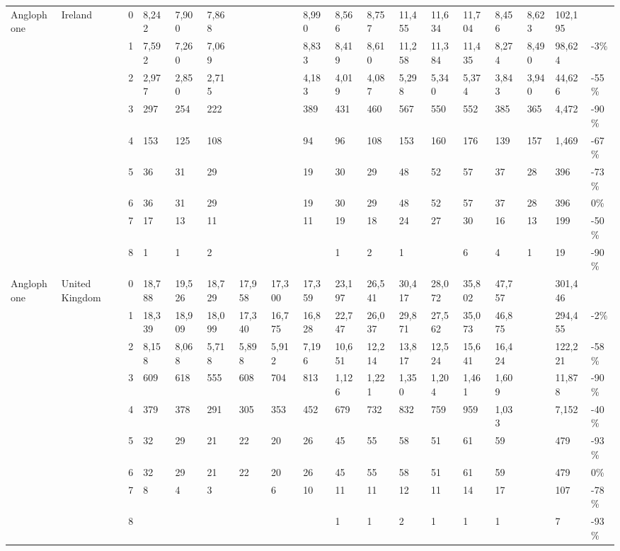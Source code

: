 \begin{longtable}{llllllllllllllllll}
 \hline
Anglophone & Ireland & 0 & 8,242 & 7,900 & 7,868 &  &  & 8,990 & 8,566 & 8,757 & 11,455 & 11,634 & 11,704 & 8,456 & 8,623 & 102,195 &  \\ 
   &  & 1 & 7,592 & 7,260 & 7,069 &  &  & 8,833 & 8,419 & 8,610 & 11,258 & 11,384 & 11,435 & 8,274 & 8,490 & 98,624 & -3\% \\ 
   &  & 2 & 2,977 & 2,850 & 2,715 &  &  & 4,183 & 4,019 & 4,087 & 5,298 & 5,340 & 5,374 & 3,843 & 3,940 & 44,626 & -55\% \\ 
   &  & 3 & 297 & 254 & 222 &  &  & 389 & 431 & 460 & 567 & 550 & 552 & 385 & 365 & 4,472 & -90\% \\ 
   &  & 4 & 153 & 125 & 108 &  &  & 94 & 96 & 108 & 153 & 160 & 176 & 139 & 157 & 1,469 & -67\% \\ 
   &  & 5 & 36 & 31 & 29 &  &  & 19 & 30 & 29 & 48 & 52 & 57 & 37 & 28 & 396 & -73\% \\ 
   &  & 6 & 36 & 31 & 29 &  &  & 19 & 30 & 29 & 48 & 52 & 57 & 37 & 28 & 396 & 0\% \\ 
   &  & 7 & 17 & 13 & 11 &  &  & 11 & 19 & 18 & 24 & 27 & 30 & 16 & 13 & 199 & -50\% \\ 
   &  & 8 & 1 & 1 & 2 &  &  &  & 1 & 2 & 1 &  & 6 & 4 & 1 & 19 & -90\% \\ 
  Anglophone & United Kingdom & 0 & 18,788 & 19,526 & 18,729 & 17,958 & 17,300 & 17,359 & 23,197 & 26,541 & 30,417 & 28,072 & 35,802 & 47,757 &  & 301,446 &  \\ 
   &  & 1 & 18,339 & 18,909 & 18,099 & 17,340 & 16,775 & 16,828 & 22,747 & 26,037 & 29,871 & 27,562 & 35,073 & 46,875 &  & 294,455 & -2\% \\ 
   &  & 2 & 8,158 & 8,068 & 5,718 & 5,898 & 5,912 & 7,196 & 10,651 & 12,214 & 13,817 & 12,524 & 15,641 & 16,424 &  & 122,221 & -58\% \\ 
   &  & 3 & 609 & 618 & 555 & 608 & 704 & 813 & 1,126 & 1,221 & 1,350 & 1,204 & 1,461 & 1,609 &  & 11,878 & -90\% \\ 
   &  & 4 & 379 & 378 & 291 & 305 & 353 & 452 & 679 & 732 & 832 & 759 & 959 & 1,033 &  & 7,152 & -40\% \\ 
   &  & 5 & 32 & 29 & 21 & 22 & 20 & 26 & 45 & 55 & 58 & 51 & 61 & 59 &  & 479 & -93\% \\ 
   &  & 6 & 32 & 29 & 21 & 22 & 20 & 26 & 45 & 55 & 58 & 51 & 61 & 59 &  & 479 & 0\% \\ 
   &  & 7 & 8 & 4 & 3 &  & 6 & 10 & 11 & 11 & 12 & 11 & 14 & 17 &  & 107 & -78\% \\ 
   &  & 8 &  &  &  &  &  &  & 1 & 1 & 2 & 1 & 1 & 1 &  & 7 & -93\% \\ 

\end{longtable}
